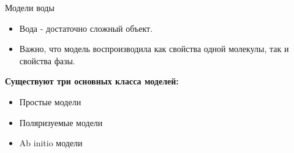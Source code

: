 \begin{frame}{Модели воды}
	\begin{itemize}
		\item	Вода - достаточно сложный объект.
		\item	Важно, что модель воспроизводила как свойства одной молекулы, так и свойства фазы.
	\end{itemize}
    \vspace{.5cm}

    \textbf{Существуют три основных  класса моделей:}

	\begin{itemize}
		\item Простые модели
		\item Поляризуемые модели
		\item Ab initio модели 
	\end{itemize}
\end{frame}

